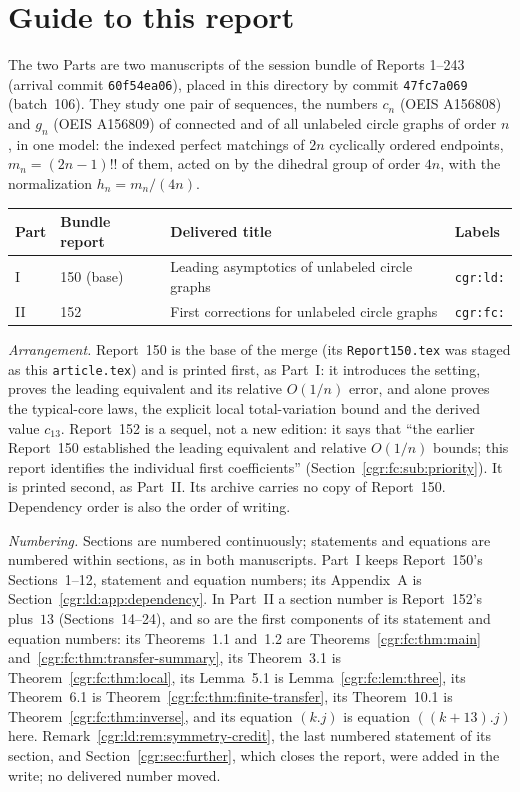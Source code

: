 \documentclass[11pt,letterpaper]{article}
\numberwithin{equation}{section}
\theoremstyle{definition}\newtheorem{definition}[theorem]{Definition}
\theoremstyle{remark}\newtheorem{remark}[theorem]{Remark}
\newcommand{\file}[1]{\nolinkurl{#1}}
\begin{document}
\section*{Guide to this report}\label{cgr:sec:guide}
The two Parts are two manuscripts of the session bundle of Reports 1--243 (arrival commit \texttt{60f54ea06}), placed in this directory by commit \texttt{47fc7a069} (batch~106). They study one pair of sequences, the numbers $c_n$ (OEIS A156808) and $g_n$ (OEIS A156809) of connected and of all unlabeled circle graphs of order $n$, in one model: the indexed perfect matchings of $2n$ cyclically ordered endpoints, $m_n=(2n-1)!!$ of them, acted on by the dihedral group of order $4n$, with the normalization $h_n=m_n/(4n)$.
\begin{center}
\small
\begin{tabular}{@{}l l >{\raggedright\arraybackslash}p{} l@{}}
\toprule
Part & Bundle report & Delivered title & Labels\\
\midrule
I & 150 (base) & Leading asymptotics of unlabeled circle graphs & \texttt{cgr:ld:}\\
II & 152 & First corrections for unlabeled circle graphs & \texttt{cgr:fc:}\\
\bottomrule
\end{tabular}
\end{center}
\emph{Arrangement.} Report~150 is the base of the merge (its \file{Report150.tex} was staged as this \file{article.tex}) and is printed first, as Part~I: it introduces the setting, proves the leading equivalent and its relative $O(1/n)$ error, and alone proves the typical-core laws, the explicit local total-variation bound and the derived value $c_{13}$. Report~152 is a sequel, not a new edition: it says that ``the earlier Report~150 established the leading equivalent and relative $O(1/n)$ bounds; this report identifies the individual first coefficients'' (Section~\ref{cgr:fc:sub:priority}). It is printed second, as Part~II. Its archive carries no copy of Report~150. Dependency order is also the order of writing.

\emph{Numbering.} Sections are numbered continuously; statements and equations are numbered within sections, as in both manuscripts. Part~I keeps Report~150's Sections~1--12, statement and equation numbers; its Appendix~A is Section~\ref{cgr:ld:app:dependency}. In Part~II a section number is Report~152's plus~$13$ (Sections~14--24), and so are the first components of its statement and equation numbers: its Theorems~1.1 and~1.2 are Theorems~\ref{cgr:fc:thm:main} and~\ref{cgr:fc:thm:transfer-summary}, its Theorem~3.1 is Theorem~\ref{cgr:fc:thm:local}, its Lemma~5.1 is Lemma~\ref{cgr:fc:lem:three}, its Theorem~6.1 is Theorem~\ref{cgr:fc:thm:finite-transfer}, its Theorem~10.1 is Theorem~\ref{cgr:fc:thm:inverse}, and its equation $(k.j)$ is equation $((k+13).j)$ here. Remark~\ref{cgr:ld:rem:symmetry-credit}, the last numbered statement of its section, and Section~\ref{cgr:sec:further}, which closes the report, were added in the write; no delivered number moved.
\end{document}
